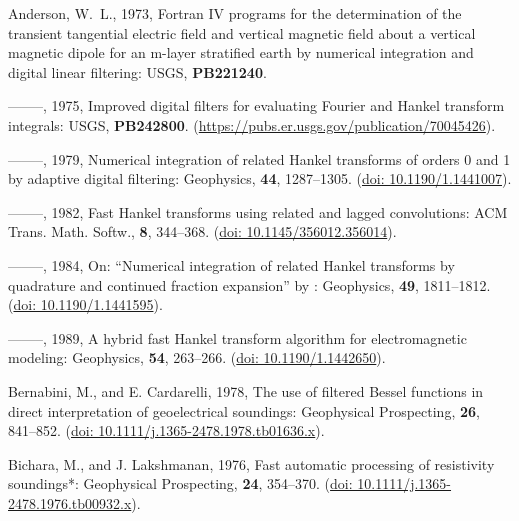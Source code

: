 \documentclass[paper,twocolumn,twoside]{geophysics}
\begin{document}
\begin{thebibliography}{}
\itemsep0pt

Anderson, W.~L.,  1973, Fortran {IV} programs for the determination of the
  transient tangential electric field and vertical magnetic field about a
  vertical magnetic dipole for an m-layer stratified earth by numerical
  integration and digital linear filtering: USGS, {\bf PB221240}.

--------, 1975, Improved digital filters for evaluating {F}ourier and {H}ankel
  transform integrals: USGS, {\bf PB242800}.
\newblock
  (\href{https://pubs.er.usgs.gov/publication/70045426}{https://pubs.er.usgs.gov/publication/70045426}).

--------, 1979, Numerical integration of related {H}ankel transforms of orders
  0 and 1 by adaptive digital filtering: Geophysics, {\bf 44}, 1287--1305.
\newblock (\href{http://doi.org/10.1190/1.1441007}{doi: 10.1190/1.1441007}).

--------, 1982, Fast {H}ankel transforms using related and lagged convolutions:
  ACM Trans. Math. Softw., {\bf 8}, 344--368.
\newblock (\href{http://doi.acm.org/10.1145/356012.356014}{doi:
  10.1145/356012.356014}).

--------, 1984, {On: “Numerical integration of related Hankel transforms by
  quadrature and continued fraction expansion” by \cite{GEO.83.Chave}}:
  Geophysics, {\bf 49}, 1811--1812.
\newblock (\href{http://doi.org/10.1190/1.1441595}{doi: 10.1190/1.1441595}).

--------, 1989, A hybrid fast {H}ankel transform algorithm for electromagnetic
  modeling: Geophysics, {\bf 54}, 263--266.
\newblock (\href{http://doi.org/10.1190/1.1442650}{doi: 10.1190/1.1442650}).

Bernabini, M., and E. Cardarelli,  1978, The use of filtered {B}essel functions
  in direct interpretation of geoelectrical soundings: Geophysical Prospecting,
  {\bf 26}, 841--852.
\newblock (\href{http://doi.org/10.1111/j.1365-2478.1978.tb01636.x}{doi:
  10.1111/j.1365-2478.1978.tb01636.x}).

Bichara, M., and J. Lakshmanan,  1976, Fast automatic processing of resistivity
  soundings*: Geophysical Prospecting, {\bf 24}, 354--370.
\newblock (\href{http://doi.org/10.1111/j.1365-2478.1976.tb00932.x}{doi:
  10.1111/j.1365-2478.1976.tb00932.x}).


\end{thebibliography}
\end{document}
